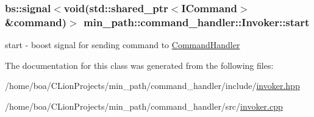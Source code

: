 \subsubsection[{\texorpdfstring{start}{start}}]{\setlength{\rightskip}{0pt plus 5cm}bs\+::signal$<$void(std\+::shared\+\_\+ptr$<${\bf I\+Command}$>$ \&command)$>$ min\+\_\+path\+::command\+\_\+handler\+::\+Invoker\+::start}\hypertarget{a00009_a9586c0c0672e02050699b4c95fd78169_a9586c0c0672e02050699b4c95fd78169}{}\label{a00009_a9586c0c0672e02050699b4c95fd78169_a9586c0c0672e02050699b4c95fd78169}


start -\/ boost signal for sending command to \hyperlink{a00003}{Command\+Handler} 



The documentation for this class was generated from the following files\+:\begin{DoxyCompactItemize}
\item 
/home/boa/\+C\+Lion\+Projects/min\+\_\+path/command\+\_\+handler/include/\hyperlink{a00022}{invoker.\+hpp}\item 
/home/boa/\+C\+Lion\+Projects/min\+\_\+path/command\+\_\+handler/src/\hyperlink{a00027}{invoker.\+cpp}\end{DoxyCompactItemize}

